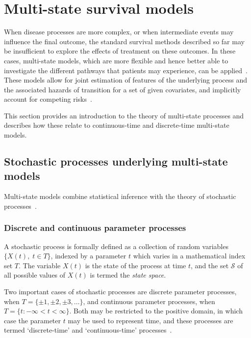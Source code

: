 \section{Multi-state survival models}\label{sec:multi-state-models}

When disease processes are more complex, or when intermediate events may influence the final outcome, the standard survival methods described so far may be insufficient to explore the effects of treatment on these outcomes. In these cases, multi-state models, which are more flexible and hence better able to investigate the different pathways that patients may experience, can be applied~\parencite{Le-Rademacher2018-eq}. These models allow for joint estimation of features of the underlying process and the associated hazards of transition for a set of given covariates, and implicitly account for competing risks~\parencite{Andersen2002-uv, van-den-Hout2016-xy, Jackson2011-ry}.

This section provides an introduction to the theory of multi-state processes and describes how these relate to continuous-time and discrete-time multi-state models.

\subsection{Stochastic processes underlying multi-state models}

Multi-state models combine statistical inference with the theory of stochastic processes~\parencite{van-den-Hout2016-xy}.

\subsubsection{Discrete and continuous parameter processes}

A stochastic process is formally defined as a collection of random variables $\{X(t),\; t \in T\}$, indexed by a parameter $t$ which varies in a mathematical index set $T$. The variable $X(t)$ is the state of the process at time $t$, and the set $\mathcal{S}$ of all possible values of $X(t)$ is termed the \textit{state space}.

Two important cases of stochastic processes are discrete parameter processes, when $T = \{\pm1, \pm2, \pm3, \dots\}$, and continuous parameter processes, when $T = \{t:-\infty<t<\infty\}$. Both may be restricted to the positive domain, in which case the parameter $t$ may be used to represent time, and these processes are termed `discrete-time' and `continuous-time' processes~\parencite{Parzen1999-te}.

